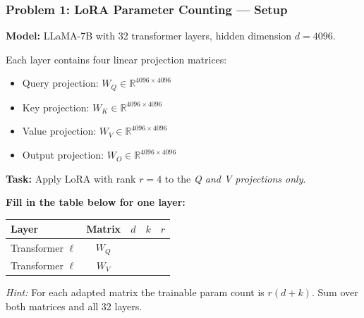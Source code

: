 \documentclass[9pt,t]{beamer}
\begin{document}
\begin{frame}
\frametitle{Problem 1: LoRA Parameter Counting --- Setup}

\textbf{Model:} LLaMA-7B with 32 transformer layers, hidden dimension $d = 4096$.

Each layer contains four linear projection matrices:
\begin{itemize}
  \item Query projection: $W_Q \in \mathbb{R}^{4096 \times 4096}$
  \item Key projection: $W_K \in \mathbb{R}^{4096 \times 4096}$
  \item Value projection: $W_V \in \mathbb{R}^{4096 \times 4096}$
  \item Output projection: $W_O \in \mathbb{R}^{4096 \times 4096}$
\end{itemize}

\textbf{Task:} Apply LoRA with rank $r = 4$ to the \emph{Q and V projections only}.

\medskip
\textbf{Fill in the table below for one layer:}

\begin{center}
\begin{tabular}{lcccc}
\toprule
\textbf{Layer} & \textbf{Matrix} & \textbf{$d$} & \textbf{$k$} & \textbf{$r$} \\
\midrule
Transformer $\ell$ & $W_Q$ & \phantom{4096} & \phantom{4096} & \phantom{4} \\
Transformer $\ell$ & $W_V$ & \phantom{4096} & \phantom{4096} & \phantom{4} \\
\bottomrule
\end{tabular}
\end{center}

\medskip
\small \textit{Hint:} For each adapted matrix the trainable param count is $r(d + k)$.
Sum over both matrices and all 32 layers.
\end{frame}
\end{document}
